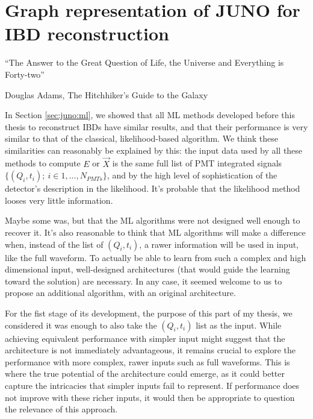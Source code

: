 \documentclass[../main.tex]{subfiles}
\begin{document}
\chapter{Graph representation of JUNO for IBD reconstruction}
\label{sec:jgnn}
\epigraph{``The Answer to the Great Question of Life, the Universe and Everything is Forty-two''}{Douglas Adams, The Hitchhiker's Guide to the Galaxy}

\minitoc


In Section \ref{sec:juno:ml}, we showed that all ML methods developed before this thesis to reconstruct IBDs have similar results, and that their performance is very similar to that of the classical, likelihood-based algorithm.
We think these similarities can reasonably be explained by this: the input data used by all these methods to compute $E$ or $\vec{X}$  is the same full list of PMT integrated signals $ \{ (Q_i,t_i) ; ~ i \in  1, ..., N_{PMTs} \}$, and by the high level of sophistication of the detector's description in the likelihood. It's probable that the likelihood method looses very little information.

Maybe some was, but that the ML algorithms were not designed well enough to recover it. It's also reasonable to think that ML algorithms will make a difference when, instead of the list of $(Q_i, t_i)$, a rawer information will be used in input, like the full waveform.
To actually be able to learn from such a complex and high dimensional input, well-designed architectures (that would guide the learning toward the solution) are necessary. In any case, it seemed welcome to us to propose an additional algorithm, with an original architecture.

For the fist stage of its development, the purpose of this part of my thesis, we considered it was enough to also take the $(Q_i, t_i)$ list as the input.
While achieving equivalent performance with simpler input might suggest that the architecture is not immediately advantageous, it remains crucial to explore the performance with more complex, rawer inputs such as full waveforms. This is where the true potential of the architecture could emerge, as it could better capture the intricacies that simpler inputs fail to represent. If performance does not improve with these richer inputs, it would then be appropriate to question the relevance of this approach.
\end{document}
